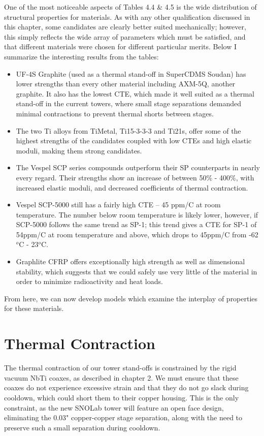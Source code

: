\documentclass{report}
\begin{document}
One of the most noticeable aspects of Tables 4.4 \& 4.5 is the wide distribution of structural properties for materials. As with any other qualification discussed in this chapter, some candidates are clearly better suited mechanically; however, this simply reflects the wide array of parameters which must be satisfied, and that different materials were chosen for different particular merits. Below I summarize the interesting results from the tables:
\begin{itemize}
\item UF-4S Graphite (used as a thermal stand-off in SuperCDMS Soudan) has lower strengths than every other material including AXM-5Q,
another graphite. It also has the lowest CTE, which made it well suited as a thermal stand-off in the current towers, where small stage separations demanded minimal contractions to prevent thermal shorts between stages.
\item The two Ti alloys from TiMetal, Ti15-3-3-3 and Ti21s, offer some of the highest strengths of the candidates coupled with low CTEs and high elastic moduli, making them strong candidates.
\item The Vespel SCP series compounds outperform their SP counterparts in nearly every regard. Their strengths show an increase of between 50\% - 400\%, with increased elastic moduli, and decreased coefficients of thermal contraction.
\item Vespel SCP-5000 still has a fairly high CTE -- 45 ppm/C at room temperature. The number below room temperature is likely lower, however, if SCP-5000 follows the same trend as SP-1; this trend gives a CTE for SP-1 of 54ppm/C at room temperature and above, which drops to 45ppm/C from -62$^{o}$C - 23$^{o}$C.
\item Graphlite CFRP offers exceptionally high strength as well as dimensional stability, which suggests that we could safely use very little of the material in order to minimize radioactivity and heat loads.
\end{itemize}

From here, we can now develop models which examine the interplay of properties for these materials.


\section{Thermal Contraction}

The thermal contraction of our tower stand-offs is constrained by the rigid vacuum NbTi coaxes, as described in chapter 2. We must ensure that these coaxes do not experience excessive strain and that they do not go slack during cooldown, which could short them to their copper housing. This is the only constraint, as the new SNOLab tower will feature an open face design, eliminating the 0.03" copper-copper stage separation, along with the need to preserve such a small separation during cooldown.
\end{document}
